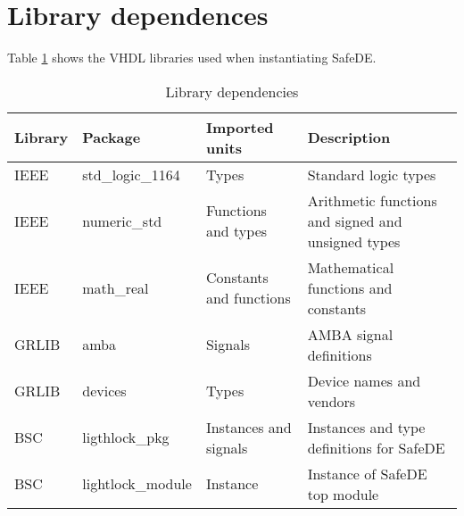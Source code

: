 \section{Library dependences}
Table \ref{dep_tab} shows the VHDL libraries used when instantiating SafeDE.\\
\begin{table}[H]
	\caption{Library dependencies}
	\label{dep_tab}
	\centering
		\begin{small}
	\begin{tabular}{|l|l|l|l|}
		\hline
		\textbf{Library} & \textbf{Package}  & \textbf{Imported units}  & \textbf{Description} \\
		\hline
		IEEE & std\_logic\_1164 & Types & Standard logic types\\
		\hline
		IEEE & numeric\_std & Functions and types & Arithmetic functions and signed and unsigned types\\
		\hline
		IEEE & math\_real & Constants and functions & Mathematical functions and constants\\
		\hline
		GRLIB & amba & Signals & AMBA signal definitions\\
		\hline
		GRLIB & devices  & Types  & Device names and vendors \\
		\hline
		BSC & ligthlock\_pkg & Instances and signals & Instances and type definitions for SafeDE\\
		\hline
		BSC & lightlock\_module & Instance & Instance of SafeDE top module\\
		\hline
	\end{tabular}
\end{small}
\end{table}


\hspace{2cm}
